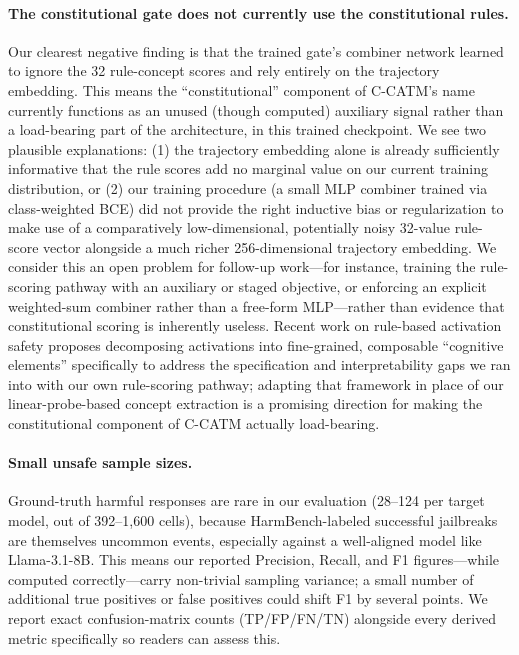 \documentclass[11pt]{article}
\begin{document}
\paragraph{The constitutional gate does not currently use the constitutional rules.} Our clearest negative finding is that the trained gate's combiner network learned to ignore the 32 rule-concept scores and rely entirely on the trajectory embedding. This means the ``constitutional'' component of C-CATM's name currently functions as an unused (though computed) auxiliary signal rather than a load-bearing part of the architecture, in this trained checkpoint. We see two plausible explanations: (1) the trajectory embedding alone is already sufficiently informative that the rule scores add no marginal value on our current training distribution, or (2) our training procedure (a small MLP combiner trained via class-weighted BCE) did not provide the right inductive bias or regularization to make use of a comparatively low-dimensional, potentially noisy 32-value rule-score vector alongside a much richer 256-dimensional trajectory embedding. We consider this an open problem for follow-up work---for instance, training the rule-scoring pathway with an auxiliary or staged objective, or enforcing an explicit weighted-sum combiner rather than a free-form MLP---rather than evidence that constitutional scoring is inherently useless. Recent work on rule-based activation safety \citep{rozenfeld2026gavel} proposes decomposing activations into fine-grained, composable ``cognitive elements'' specifically to address the specification and interpretability gaps we ran into with our own rule-scoring pathway; adapting that framework in place of our linear-probe-based concept extraction is a promising direction for making the constitutional component of C-CATM actually load-bearing.

\paragraph{Small unsafe sample sizes.} Ground-truth harmful responses are rare in our evaluation (28--124 per target model, out of 392--1{,}600 cells), because HarmBench-labeled successful jailbreaks are themselves uncommon events, especially against a well-aligned model like Llama-3.1-8B. This means our reported Precision, Recall, and F1 figures---while computed correctly---carry non-trivial sampling variance; a small number of additional true positives or false positives could shift F1 by several points. We report exact confusion-matrix counts (TP/FP/FN/TN) alongside every derived metric specifically so readers can assess this.
\end{document}

